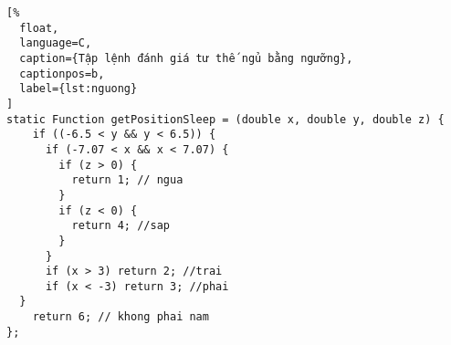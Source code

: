 \begin{lstlisting}[%
  float,
  language=C,
  caption={Tập lệnh đánh giá tư thế ngủ bằng ngưỡng},
  captionpos=b,
  label={lst:nguong}
]
static Function getPositionSleep = (double x, double y, double z) {
    if ((-6.5 < y && y < 6.5)) {
      if (-7.07 < x && x < 7.07) {
        if (z > 0) {
          return 1; // ngua
        }
        if (z < 0) {
          return 4; //sap
        }
      }
      if (x > 3) return 2; //trai
      if (x < -3) return 3; //phai
  }
    return 6; // khong phai nam
};
\end{lstlisting}
